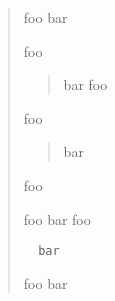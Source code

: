 \begin{quote}

foo
 bar

foo

\begin{quote}

bar
foo
\end{quote}

foo

\begin{quote}

bar
\end{quote}

foo

foo
 bar
 foo

\begin{verbatim}
  bar
\end{verbatim}

foo
bar
\end{quote}
